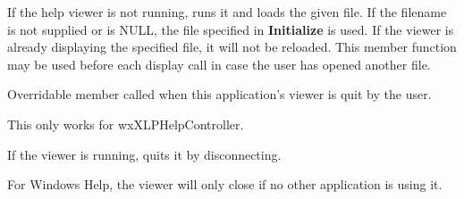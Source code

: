 
If the help viewer is not running, runs it and loads the given file.
If the filename is not supplied or is
NULL, the file specified in {\bf Initialize} is used. If the viewer is
already displaying the specified file, it will not be reloaded. This
member function may be used before each display call in case the user
has opened another file.

\label{wxhelpcontrollerbaseonquit}


Overridable member called when this application's viewer is quit by the user.

This only works for wxXLPHelpController.

\label{wxhelpcontrollerbasequit}


If the viewer is running, quits it by disconnecting.

For Windows Help, the viewer will only close if no other application is using it.

